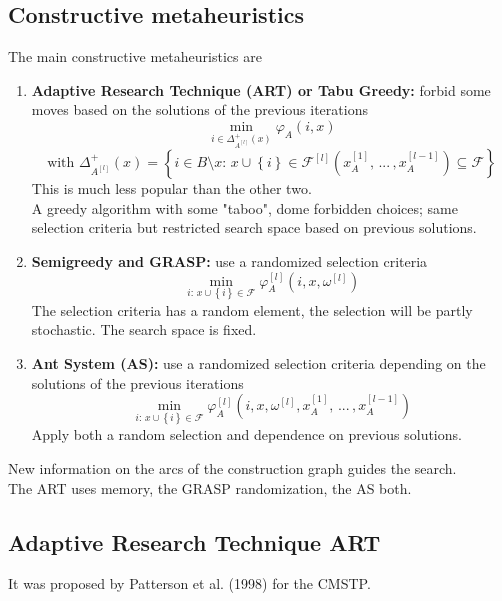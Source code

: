 \documentclass[11pt]{article}
\begin{document}
	\subsection{Constructive metaheuristics}
	The main constructive metaheuristics are
	\begin{enumerate}
		\item \textbf{Adaptive Research Technique (ART) or Tabu Greedy:} forbid some moves based on the solutions of the previous iterations
		$$ \min_{i \in \Delta_{A^{[l]}}^+ (x) } \varphi_A (i, x) $$
		$$ \text{with } \Delta_{A^{[l]}}^+ (x) = \left\{ i \in B \setminus x: \, x \cup \left\{i\right\} \in \mathcal{F}^{[l]} \left(x_A^{[1]}, \, ... \, , x_A^{[l-1]}\right) \subseteq \mathcal{F} \right\}$$
		This is much less popular than the other two.\\
		A greedy algorithm with some "taboo", dome forbidden choices; same selection criteria but restricted search space based on previous solutions.\\
		
		\item \textbf{Semigreedy and GRASP:} use a randomized selection criteria
		$$ \min_{i: \, x \cup \left\{i\right\} \in \mathcal{F}} \varphi_A^{[l]} \left(i, x, \omega^{[l]}\right) $$
		The selection criteria has a random element, the selection will be partly stochastic. The search space is fixed.\\
		
		\item \textbf{Ant System (AS):} use a randomized selection criteria depending on the solutions of the previous iterations
		$$ \min_{i: \, x \cup \left\{i\right\} \in \mathcal{F}} \varphi_A^{[l]} \left(i, x, \omega^{[l]}, x_A^{[1]}, \, ... \, , x_A^{[l-1]}\right) $$
		Apply both a random selection and dependence on previous solutions.\\
	\end{enumerate}
	
	New information on the arcs of the construction graph guides the search.\\
	The ART uses memory, the GRASP randomization, the AS both.\\
	
	\newpage
	
	\subsection{Adaptive Research Technique ART}
	It was proposed by Patterson et al. (1998) for the CMSTP.\\
	
\end{document}
